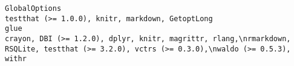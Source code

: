 \documentclass[
  letterpaper,
  DIV=11,
  numbers=noendperiod]{scrreprt}
\begin{document}
\begin{verbatim}
GlobalOptions                                                                                                                                                                                                                                                                                                                                                                                                                                                                                                                                                                                                                                                                                                                                                                                                                                                                                                                                                                                                                                                                                                                                                                                                                                                testthat (>= 1.0.0), knitr, markdown, GetoptLong
glue                                                                                                                                                                                                                                                                                                                                                                                                                                                                                                                                                                                                                                                                                                                                                                                                                                                                                                                                                                                                                                                                                                                                                              crayon, DBI (>= 1.2.0), dplyr, knitr, magrittr, rlang,\nrmarkdown, RSQLite, testthat (>= 3.2.0), vctrs (>= 0.3.0),\nwaldo (>= 0.5.3), withr

\end{verbatim}
\end{document}
